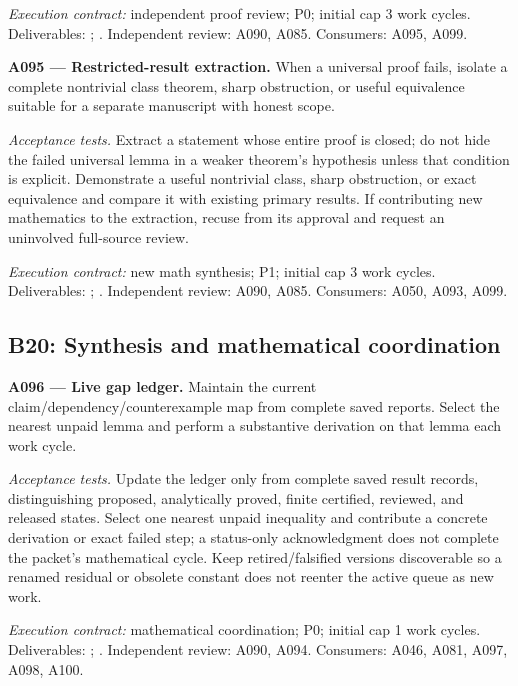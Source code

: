 \documentclass[11pt]{article}
\begin{document}
{\small\emph{Execution contract:} independent proof review; P0; initial cap 3 work cycles. Deliverables: ; . Independent review: A090, A085. Consumers: A095, A099.}

\textbf{A095 --- Restricted-result extraction.} When a universal proof fails, isolate a complete nontrivial class theorem, sharp obstruction, or useful equivalence suitable for a separate manuscript with honest scope.

\emph{Acceptance tests.} Extract a statement whose entire proof is closed; do not hide the failed universal lemma in a weaker theorem's hypothesis unless that condition is explicit. Demonstrate a useful nontrivial class, sharp obstruction, or exact equivalence and compare it with existing primary results. If contributing new mathematics to the extraction, recuse from its approval and request an uninvolved full-source review.

{\small\emph{Execution contract:} new math synthesis; P1; initial cap 3 work cycles. Deliverables: ; . Independent review: A090, A085. Consumers: A050, A093, A099.}

\subsection{B20: Synthesis and mathematical coordination}

\textbf{A096 --- Live gap ledger.} Maintain the current claim/dependency/counterexample map from complete saved reports. Select the nearest unpaid lemma and perform a substantive derivation on that lemma each work cycle.

\emph{Acceptance tests.} Update the ledger only from complete saved result records, distinguishing proposed, analytically proved, finite certified, reviewed, and released states. Select one nearest unpaid inequality and contribute a concrete derivation or exact failed step; a status-only acknowledgment does not complete the packet's mathematical cycle. Keep retired/falsified versions discoverable so a renamed residual or obsolete constant does not reenter the active queue as new work.

{\small\emph{Execution contract:} mathematical coordination; P0; initial cap 1 work cycles. Deliverables: ; . Independent review: A090, A094. Consumers: A046, A081, A097, A098, A100.}
\end{document}
